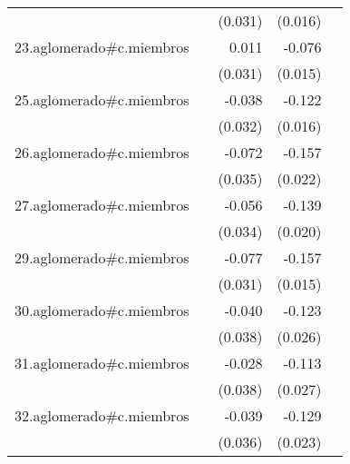 {\begin{longtable}{l*{4}{D{.}{.}{-1}}}
            &                     &     (0.031)         &     (0.016)         &                     \\
\addlinespace
23.aglomerado#c.miembros&                     &       0.011         &      -0.076\sym{***}&                     \\
            &                     &     (0.031)         &     (0.015)         &                     \\
\addlinespace
25.aglomerado#c.miembros&                     &      -0.038         &      -0.122\sym{***}&                     \\
            &                     &     (0.032)         &     (0.016)         &                     \\
\addlinespace
26.aglomerado#c.miembros&                     &      -0.072\sym{*}  &      -0.157\sym{***}&                     \\
            &                     &     (0.035)         &     (0.022)         &                     \\
\addlinespace
27.aglomerado#c.miembros&                     &      -0.056         &      -0.139\sym{***}&                     \\
            &                     &     (0.034)         &     (0.020)         &                     \\
\addlinespace
29.aglomerado#c.miembros&                     &      -0.077\sym{*}  &      -0.157\sym{***}&                     \\
            &                     &     (0.031)         &     (0.015)         &                     \\
\addlinespace
30.aglomerado#c.miembros&                     &      -0.040         &      -0.123\sym{***}&                     \\
            &                     &     (0.038)         &     (0.026)         &                     \\
\addlinespace
31.aglomerado#c.miembros&                     &      -0.028         &      -0.113\sym{***}&                     \\
            &                     &     (0.038)         &     (0.027)         &                     \\
\addlinespace
32.aglomerado#c.miembros&                     &      -0.039         &      -0.129\sym{***}&                     \\
            &                     &     (0.036)         &     (0.023)         &                     \\

\end{longtable}}
